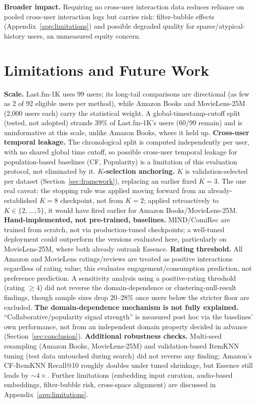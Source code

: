 \documentclass{article}
\begin{document}
\textbf{Broader impact.} Requiring no cross-user interaction data reduces reliance on pooled cross-user interaction logs but carries risk: filter-bubble effects (Appendix~\ref{app:limitations}) and possible degraded quality for sparse/atypical-history users, an unmeasured equity concern.

\section{Limitations and Future Work}
\label{sec:limitations}

\textbf{Scale.} Last.fm-1K uses 99 users; its long-tail comparisons are directional (as few as 2 of 92 eligible users per method), while Amazon Books and MovieLens-25M (2{,}000 users each) carry the statistical weight. A global-timestamp-cutoff split (tested, not adopted) strands 39\% of Last.fm-1K's users (60/99 remain) and is uninformative at this scale, unlike Amazon Books, where it held up. \textbf{Cross-user temporal leakage.} The chronological split is computed independently per user, with no shared global time cutoff, so possible cross-user temporal leakage for population-based baselines (CF, Popularity) is a limitation of this evaluation protocol, not eliminated by it. \textbf{$K$-selection anchoring.} $K$ is validation-selected per dataset (Section~\ref{sec:framework}), replacing an earlier fixed $K=3$. The one real caveat: the stopping rule was applied moving forward from an already-established $K=8$ checkpoint, not from $K=2$; applied retroactively to $K\in\{2,\ldots,5\}$, it would have fired earlier for Amazon Books/MovieLens-25M. \textbf{Hand-implemented, not pre-trained, baselines.} MIND/ComiRec are trained from scratch, not via production-tuned checkpoints; a well-tuned deployment could outperform the versions evaluated here, particularly on MovieLens-25M, where both already outrank Essence. \textbf{Rating threshold.} All Amazon and MovieLens ratings/reviews are treated as positive interactions regardless of rating value; this evaluates engagement/consumption prediction, not preference prediction. A sensitivity analysis using a positive-rating threshold (rating $\geq 4$) did not reverse the domain-dependence or clustering-null-result findings, though sample sizes drop 20--28\% once users below the stricter floor are excluded. \textbf{The domain-dependence mechanism is not fully explained.} ``Collaborative/popularity signal strength'' is measured post hoc via the baselines' own performance, not from an independent domain property decided in advance (Section~\ref{sec:conclusion}). \textbf{Additional robustness checks.} Multi-seed resampling (Amazon Books, MovieLens-25M) and validation-based ItemKNN tuning (test data untouched during search) did not reverse any finding; Amazon's CF-ItemKNN Recall@10 roughly doubles under tuned shrinkage, but Essence still leads by $\sim4\times$. Further limitations (embedding input curation, audio-based embeddings, filter-bubble risk, cross-space alignment) are discussed in Appendix~\ref{app:limitations}.
\end{document}
